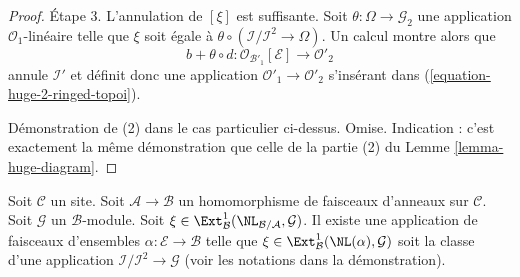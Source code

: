 \begin{proof}
\medskip\noindent
Étape 3. L'annulation de $[\xi]$ est suffisante. Soit
$\theta : \Omega \to \mathcal{G}_2$ une application $\mathcal{O}_1$-linéaire
telle que $\xi$ soit égale à
$\theta \circ (\mathcal{I}/\mathcal{I}^2 \to \Omega)$.
Un calcul montre alors que
$$
b + \theta \circ d :
\mathcal{O}_{\mathcal{B}'_1}[\mathcal{E}]
\longrightarrow
\mathcal{O}'_2
$$
annule $\mathcal{I}'$ et définit donc une application
$\mathcal{O}'_1 \to \mathcal{O}'_2$ s'insérant dans
(\ref{equation-huge-2-ringed-topoi}).

\medskip\noindent
Démonstration de (2) dans le cas particulier ci-dessus. Omise. Indication :
c'est exactement la même démonstration que celle de la partie (2) du
Lemme \ref{lemma-huge-diagram}.
\end{proof}

\begin{lemma}
\label{lemma-NL-represent-ext-class-ringed-topoi}
Soit $\mathcal{C}$ un site. Soit $\mathcal{A} \to \mathcal{B}$ un
homomorphisme de faisceaux d'anneaux sur $\mathcal{C}$.
Soit $\mathcal{G}$ un $\mathcal{B}$-module.
Soit
$\xi \in \Ext^1_\mathcal{B}(\NL_{\mathcal{B}/\mathcal{A}}, \mathcal{G})$.
Il existe une application de faisceaux d'ensembles
$\alpha : \mathcal{E} \to \mathcal{B}$ telle que
$\xi \in \Ext^1_\mathcal{B}(\NL(\alpha), \mathcal{G})$ soit la classe d'une
application $\mathcal{I}/\mathcal{I}^2 \to \mathcal{G}$ (voir les notations
dans la démonstration).
\end{lemma}

